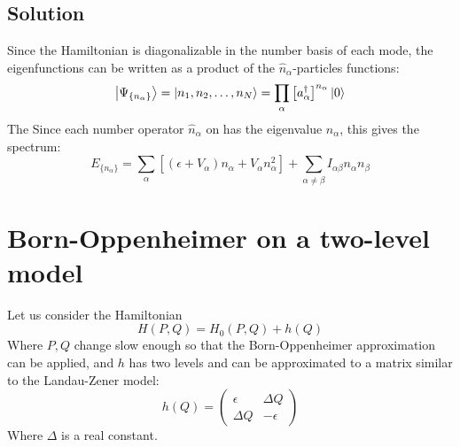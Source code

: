 \documentclass{article}
\begin{document}
\subsection{Solution}
Since the Hamiltonian is diagonalizable in the number basis of each mode, the eigenfunctions can be written as a product of the $\hat{n}_\alpha$-particles functions:
\begin{equation}
    \ket{\Psi_{\{n_{\alpha}\}}} = \ket{n_1, n_2, \dots, n_N} = \prod_{\alpha} \left[a^\dagger_\alpha\right]^{n_\alpha}\ket{0}
\end{equation}
The Since each number operator $\hat{n}_\alpha$ on has the eigenvalue $n_\alpha$, this gives the spectrum:
\begin{equation}
    E_{\{n_\alpha\}} = \sum_\alpha \left[\left(\epsilon + V_{\alpha}\right) n_\alpha + V_\alpha n_\alpha^2\right] + \sum_{\alpha \ne \beta} I_{\alpha\beta} n_\alpha n_\beta
\end{equation}

\section{Born-Oppenheimer on a two-level model}
Let us consider the Hamiltonian
\begin{equation}
    H(P, Q) = H_0(P, Q) + h(Q)
\end{equation}
Where $P, Q$ change slow enough so that the Born-Oppenheimer approximation can be applied, and $h$ has two levels and can be approximated to a matrix similar to the Landau-Zener model:
\begin{equation}
    h(Q) = \begin{pmatrix}
        \epsilon & \Delta Q \\ \Delta Q & -\epsilon
    \end{pmatrix}
\end{equation}
Where $\Delta$ is a real constant.
\end{document}
